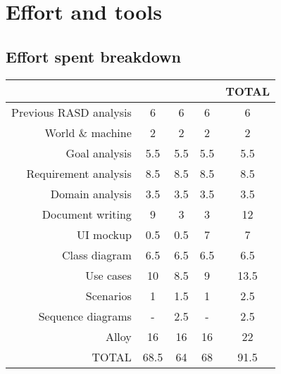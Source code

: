 \section{Effort and tools}
\label{sect:effort}

\subsection{Effort spent breakdown}
\begin{center}
	\setlength{\arrayrulewidth}{0.5mm}
	\begin{tabular}[width=\textwidth]{r | c c c | c}
		                       & 			   &  				&  				 & TOTAL \\ \hline
		Previous RASD analysis & 6             & 6              & 6              & 6     \\
		World \& machine       & 2             & 2              & 2              & 2     \\
		Goal analysis          & 5.5           & 5.5            & 5.5            & 5.5   \\
		Requirement analysis   & 8.5           & 8.5            & 8.5            & 8.5   \\
		Domain analysis        & 3.5           & 3.5            & 3.5            & 3.5   \\
		Document writing       & 9             & 3              & 3              & 12    \\
		UI mockup              & 0.5           & 0.5            & 7              & 7     \\
		Class diagram          & 6.5           & 6.5            & 6.5            & 6.5   \\
		Use cases              & 10            & 8.5            & 9              & 13.5  \\
		Scenarios              & 1             & 1.5            & 1              & 2.5   \\
		Sequence diagrams      & -             & 2.5            & -              & 2.5   \\
		Alloy                  & 16            & 16             & 16             & 22    \\ \hline
		TOTAL                  & 68.5          & 64             & 68             & 91.5  \\ 
	\end{tabular}
\end{center}


